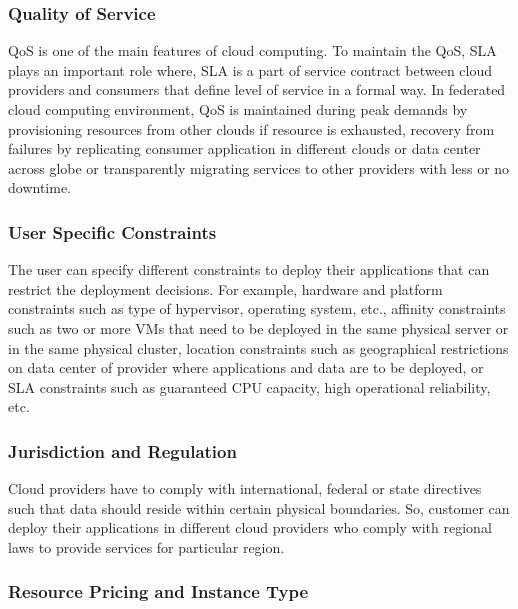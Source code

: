 \documentclass[conference]{IEEEtran}
\begin{document}
\subsubsection{Quality of Service}

QoS is one of the main features of cloud computing. To maintain the QoS, SLA plays an important role where, SLA is a part of service contract between cloud providers and consumers that define level of service in a formal way. In federated cloud computing environment, QoS is maintained during peak demands by provisioning resources from other clouds if resource is exhausted, recovery from failures by replicating consumer application in different clouds or data center across globe or transparently migrating services to other providers with less or no downtime.
\subsubsection{User Specific Constraints}

The user can specify different constraints to deploy their applications that can restrict the deployment decisions. For example, hardware and platform constraints such as type of hypervisor, operating system, etc., affinity constraints such as two or more VMs that need to be deployed in the same physical server or in the same physical cluster, location constraints such as geographical restrictions on data center of provider where applications and data are to be deployed, or SLA constraints such as guaranteed CPU capacity, high operational reliability, etc\cite {6165242}.
\subsubsection{Jurisdiction and Regulation}

Cloud providers have to comply with international, federal or state directives such that data should reside within certain physical boundaries. So, customer can deploy their applications in different cloud providers who comply with regional laws to provide services for particular region\cite{badger2011draft}.
\subsubsection{Resource Pricing and Instance Type}
\end{document}
